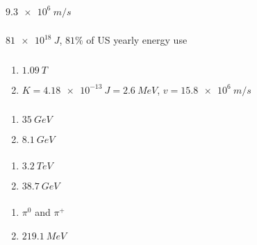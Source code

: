 \documentclass{article}
\begin{document}
$\qty{9.3e6}{m/s}$

\setcounter{subsubsection}{6}
\subsubsection{}

$\qty{81e18}{J}$, $81\%$ of US yearly energy use

\setcounter{subsubsection}{8}
\subsubsection{}

\begin{enumerate}
  \item $\qty{1.09}{T}$

  \item $K = \qty{4.18e-13}{J} = \qty{2.6}{MeV}$, $v = \qty{15.8e6}{m/s}$
\end{enumerate}

\setcounter{subsubsection}{10}
\subsubsection{}

\begin{enumerate}
  \item $\qty{35}{GeV}$

  \item $\qty{8.1}{GeV}$
\end{enumerate}

\setcounter{subsubsection}{14}
\subsubsection{}

\begin{enumerate}
  \item $\qty{3.2}{TeV}$

  \item $\qty{38.7}{GeV}$
\end{enumerate}

\setcounter{subsubsection}{16}
\subsubsection{}

\begin{enumerate}
  \item $\pi^0$ and $\pi^+$

  \item $\qty{219.1}{MeV}$
\end{enumerate}
\end{document}

